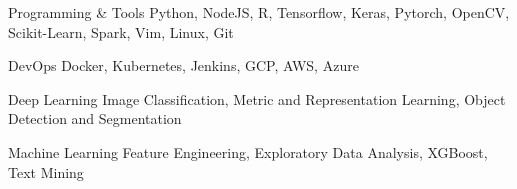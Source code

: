 

\begin{cvskills}

  \cvskill
    {Programming \& Tools} %
    {Python, NodeJS, R, Tensorflow, Keras, Pytorch, OpenCV, Scikit-Learn, Spark, Vim, Linux, Git} %

  \cvskill
    {DevOps} %
    {Docker, Kubernetes, Jenkins, GCP, AWS, Azure} %

  \cvskill
    {Deep Learning} %
    {Image Classification, Metric and Representation Learning, Object Detection and Segmentation} %

  \cvskill
    {Machine Learning} %
    {Feature Engineering, Exploratory Data Analysis, XGBoost, Text Mining} %

\end{cvskills}
